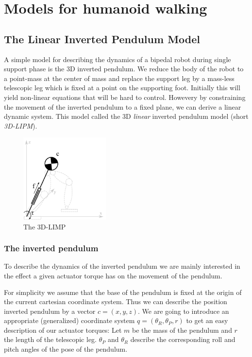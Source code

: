 \documentclass[english,ngerman]{KITreprt}
\begin{document}
\chapter{Models for humanoid walking}\label{models-for-humanoid-walking}

\section{The Linear Inverted Pendulum
Model}\label{the-linear-inverted-pendulum-model}

A simple model for describing the dynamics of a bipedal robot during
single support phase is the 3D inverted pendulum. We reduce the body of
the robot to a point-mass at the center of mass and replace the support
leg by a mass-less telescopic leg which is fixed at a point on the
supporting foot. Initially this will yield non-linear equations that
will be hard to control. Howevery by constraining the movement of the
inverted pendulum to a fixed plane, we can derive a linear dynamic
system. This model called the 3D \emph{linear} inverted pendulum model
(short \emph{3D-LIPM}).

\begin{figure}
  \begin{center}
     \includegraphics[width=0.4\textwidth]{images/3dlimp.png}
  \end{center}
  \caption{The 3D-LIMP}
\end{figure}

\subsection{The inverted pendulum}\label{the-inverted-pendulum}

To describe the dynamics of the inverted pendulum we are mainly
interested in the effect a given actuator torque has on the movement of
the pendulum.

For simplicity we assume that the base of the pendulum is fixed at the
origin of the current cartesian coordinate system. Thus we can describe
the position inverted pendulum by a vector $c = (x, y, z)$. We are going
to introduce an appropriate (generalized) coordinate system
$q = (\theta_R, \theta_P, r)$ to get an easy description of our actuator
torques: Let $m$ be the mass of the pendulum and $r$ the length of the
telescopic leg. $\theta_P$ and $\theta_R$ describe the corresponding
roll and pitch angles of the pose of the pendulum.
\end{document}
